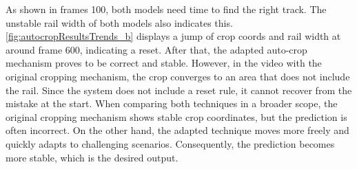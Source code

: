 As shown in frames 100, both models need time to find the right track.
The unstable rail width of both models also indicates this.
\autoref{fig:autocropResultsTrends_b} displays a jump of crop coords and rail width at around frame 600, indicating a reset.
After that, the adapted auto-crop mechanism proves to be correct and stable.
However, in the video with the original cropping mechanism, the crop converges to an area that does not include the rail.
Since the system does not include a reset rule, it cannot recover from the mistake at the start.
When comparing both techniques in a broader scope, the original cropping mechanism shows stable crop coordinates, but the prediction is often incorrect.
On the other hand, the adapted technique moves more freely and quickly adapts to challenging scenarios.
Consequently, the prediction becomes more stable, which is the desired output.